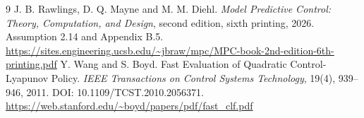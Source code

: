 \documentclass[11pt]{article}
\begin{document}
\begin{thebibliography}{9}
 J. B. Rawlings, D. Q. Mayne and M. M. Diehl.
\emph{Model Predictive Control: Theory, Computation, and Design}, second
edition, sixth printing, 2026. Assumption 2.14 and Appendix B.5.
\url{https://sites.engineering.ucsb.edu/~jbraw/mpc/MPC-book-2nd-edition-6th-printing.pdf}
 Y. Wang and S. Boyd. Fast Evaluation of Quadratic
Control-Lyapunov Policy. \emph{IEEE Transactions on Control Systems Technology},
19(4), 939--946, 2011. DOI: 10.1109/TCST.2010.2056371.
\url{https://web.stanford.edu/~boyd/papers/pdf/fast_clf.pdf}
\end{thebibliography}
\end{document}

